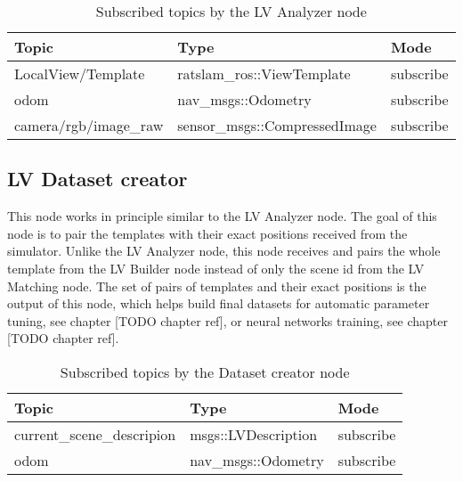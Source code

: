 \begin{table}[htpb]
    \caption{Subscribed  topics by the LV Analyzer node}\label{tab:lvAnalTopics}
    \centering
    \begin{tabular}{l l l}
        \toprule
        Topic                 & Type                          & Mode      \\
        \midrule
        LocalView/Template    & ratslam\_ros::ViewTemplate    & subscribe \\
        odom                  & nav\_msgs::Odometry           & subscribe \\
        camera/rgb/image\_raw & sensor\_msgs::CompressedImage & subscribe \\
        \bottomrule
    \end{tabular}
\end{table}

\subsection{LV Dataset creator}\label{section:lvdatasetCreator}

This node works in principle similar to the LV Analyzer node. The goal of this node is to pair the templates with their exact positions received from the simulator. Unlike the LV Analyzer node, this node receives and pairs the whole template from the LV Builder node instead of only the scene id from the LV Matching node. The set of pairs of templates and their exact positions is the output of this node, which helps build final datasets for automatic parameter tuning, see chapter [TODO chapter ref], or neural networks training, see chapter [TODO chapter ref].


\begin{table}[htpb]
    \caption{Subscribed  topics by the Dataset creator node}\label{tab:datasetCreatorTopics}
    \centering
    \begin{tabular}{l l l}
        \toprule
        Topic                      & Type                & Mode      \\
        \midrule
        current\_scene\_descripion & msgs::LVDescription & subscribe \\
        odom                       & nav\_msgs::Odometry & subscribe \\
        \bottomrule
    \end{tabular}
\end{table}